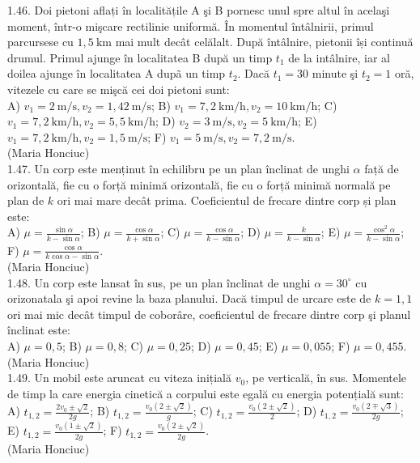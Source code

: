 \documentclass[10pt]{article}
\begin{document}
1.46. Doi pietoni aflați în localitățile A şi B pornesc unul spre altul în acelaşi moment, într-o mişcare rectilinie uniformă. În momentul întâlnirii, primul parcursese cu $1,5 \mathrm{~km}$ mai mult decât celălalt. După întâlnire, pietonii își continuă drumul. Primul ajunge în localitatea B după un timp $t_{1}$ de la intâlnire, iar al doilea ajunge în localitatea A dupã un timp $t_{2}$. Dacă $t_{1}=30$ minute şi $t_{2}=1$ oră, vitezele cu care se mişcă cei doi pietoni sunt:\\ A) $v_{1}=2 \mathrm{~m} / \mathrm{s}, v_{2}=1,42 \mathrm{~m} / \mathrm{s}$; B) $v_{1}=7,2 \mathrm{~km} / \mathrm{h}, v_{2}=10 \mathrm{~km} / \mathrm{h}$; C) $v_{1}=7,2 \mathrm{~km} / \mathrm{h}, v_{2}=5,5 \mathrm{~km} / \mathrm{h}$; D) $v_{2}=3 \mathrm{~m} / \mathrm{s}, v_{2}=5 \mathrm{~km} / \mathrm{h}$; E) $v_{1}=7,2 \mathrm{~km} / \mathrm{h}, v_{2}=1,5 \mathrm{~m} / \mathrm{s}$; F) $v_{1}=5 \mathrm{~m} / \mathrm{s}, v_{2}=7,2 \mathrm{~m} / \mathrm{s}$.\\ (Maria Honciuc)\\

1.47. Un corp este menținut în echilibru pe un plan înclinat de unghi $\alpha$ față de orizontală, fie cu o forță minimă orizontală, fie cu o forță minimă normală pe plan de $k$ ori mai mare decât prima. Coeficientul de frecare dintre corp și plan este:\\ A) $\mu=\frac{\sin \alpha}{k-\sin \alpha}$; B) $\mu=\frac{\cos \alpha}{k+\sin \alpha}$; C) $\mu=\frac{\cos \alpha}{k-\sin \alpha}$; D) $\mu=\frac{k}{k-\sin \alpha}$; E) $\mu=\frac{\cos ^{2} \alpha}{k-\sin \alpha}$; F) $\mu=\frac{\cos \alpha}{k \cos \alpha-\sin \alpha}$.\\ (Maria Honciuc)\\

1.48. Un corp este lansat în sus, pe un plan înclinat de unghi $\alpha=30^{\circ}$ cu orizonatala şi apoi revine la baza planului. Dacă timpul de urcare este de $k=1,1$ ori mai mic decât timpul de coborâre, coeficientul de frecare dintre corp şi planul înclinat este:\\ A) $\mu=0,5$; B) $\mu=0,8$; C) $\mu=0,25$; D) $\mu=0,45$; E) $\mu=0,055$; F) $\mu=0,455$.\\ (Maria Honciuc)\\

1.49. Un mobil este aruncat cu viteza inițială $v_{0}$, pe verticală, în sus. Momentele de timp la care energia cinetică a corpului este egală cu energia potențială sunt:\\ A) $t_{1,2}=\frac{2 v_{0} \pm \sqrt{2}}{2 g}$; B) $t_{1,2}=\frac{v_{0}(2 \pm \sqrt{2})}{g}$; C) $t_{1,2}=\frac{v_{0}(2 \pm \sqrt{2})}{2}$; D) $t_{1,2}=\frac{v_{0}(2 \mp \sqrt{3})}{2 g}$; E) $t_{1,2}=\frac{v_{0}(1 \pm \sqrt{2})}{2 g}$; F) $t_{1,2}=\frac{v_{0}(2 \pm \sqrt{2})}{2 g}$.\\ (Maria Honciuc)\\
\end{document}
